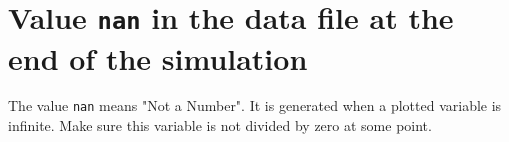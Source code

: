 \documentclass[11pt]{book}
\def\ttt#1{\texttt{#1}}
\begin{document}
\section*{Value \ttt{nan} in the data file at the end of the simulation}
The value \ttt{nan} means "Not a Number". It is generated when a plotted variable is infinite. Make sure this variable is not divided by zero at some point.


 

\printindex
\end{document}
